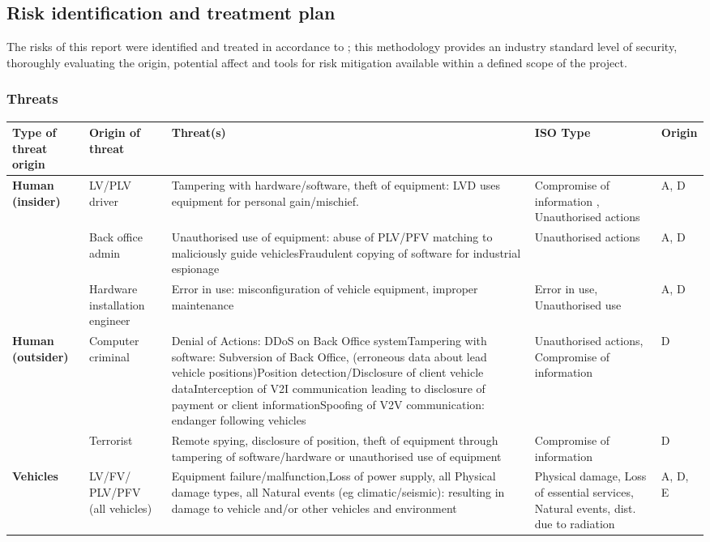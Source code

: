 \documentclass[british,11pt,a4paper]{article}
\begin{document}
\subsection{Risk identification and treatment plan}
The risks of this report were identified and treated in accordance to \citet{ISO_27005}; this methodology provides an industry standard level of security, thoroughly evaluating the origin, potential affect and tools for risk mitigation available within a defined scope of the project.
\subsubsection{Threats}
\begin{longtable}{|p{2cm}|p{1.5cm}|p{8cm}|p{3cm}|p{1.2cm}|}
\hline
\textbf{Type of threat origin} & \textbf{Origin of threat} & \textbf{Threat(s)} & \textbf{ISO Type} & \textbf{Origin} \\ \hline
\multirow{3}{2cm}{\textbf{Human (insider)}} & LV/PLV driver & Tampering with hardware/software, theft of equipment: LVD uses equipment for personal gain/mischief. & Compromise of information , Unauthorised actions& A, D \\ \cline{2-5} 
 & Back office admin & Unauthorised use of equipment: abuse of PLV/PFV matching to maliciously guide vehiclesFraudulent copying of software for industrial espionage & Unauthorised actions & A, D \\ \cline{2-5} 
 & Hardware installation engineer & Error in use: misconfiguration of vehicle equipment, improper maintenance & Error in use, Unauthorised use & A, D \\ \hline
\multirow{2}{2cm}{\textbf{Human (outsider)}} & Computer criminal & Denial of Actions: DDoS on Back Office systemTampering with software: Subversion of Back Office, (erroneous data about lead vehicle positions)Position detection/Disclosure of client vehicle dataInterception of V2I communication leading to disclosure of payment or client informationSpoofing of V2V communication: endanger following vehicles & Unauthorised actions, Compromise of information & D \\ \cline{2-5} 
 & Terrorist & Remote spying, disclosure of position, theft of equipment through tampering of software/hardware or unauthorised use of equipment & Compromise of information & D \\ \hline
\textbf{Vehicles} & LV/FV/ PLV/PFV (all vehicles) & Equipment failure/malfunction,Loss of power supply, all Physical damage types, all Natural events (eg climatic/seismic): resulting in damage to vehicle and/or other vehicles and environment & Physical damage, Loss of essential services, Natural events, dist. due to radiation & A, D, E \\ \hline

\end{longtable}
\end{document}
